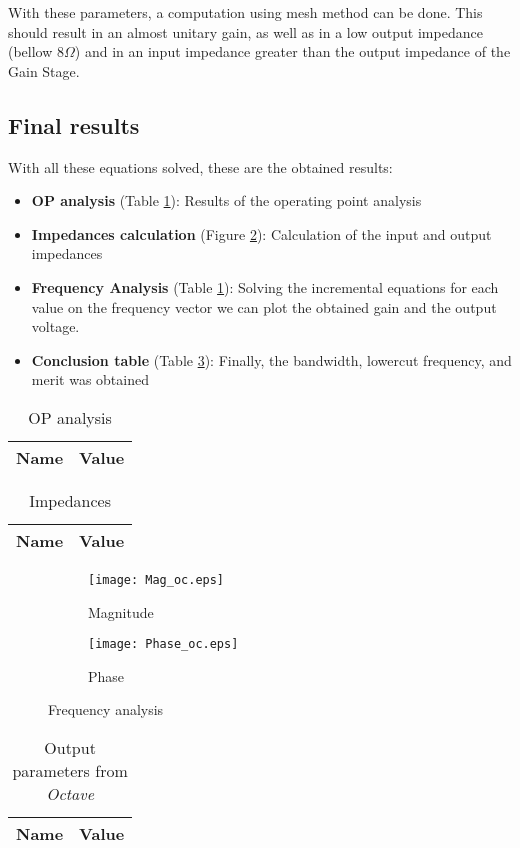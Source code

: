 With these parameters, a computation using mesh method can be done. This should result in an almost unitary gain, as well as in a low output impedance (bellow $8\Omega$) and in an input impedance greater than the output impedance of the Gain Stage.


\subsection{Final results}
\label{subsection:Octave_Results}
\indent

With all these equations solved, these are the obtained results:

\begin{itemize}
    \item \textbf{OP analysis} (Table \ref{tab:OC}): Results of the operating point analysis
    \item \textbf{Impedances calculation} (Figure \ref{tab:Impedances}): Calculation of the input and output impedances
    \item \textbf{Frequency Analysis} (Table \ref{fig:FreqA}): Solving the incremental equations for each value on the frequency vector we can plot the obtained gain and the output voltage.
    \item \textbf{Conclusion table} (Table \ref{tab:OutputParam}): Finally, the bandwidth, lowercut frequency, and merit was obtained
\end{itemize}


\begin{table}[H]
  \centering
  \begin{tabular}{|l|r|}
    \hline    
    {\bf Name} & {\bf Value} \\ \hline
    
  \end{tabular}
  \caption{OP analysis }
  \label{tab:OC}
\end{table}


\begin{table}[H]
  \centering
  \begin{tabular}{|l|r|}
    \hline    
    {\bf Name} & {\bf Value} \\ \hline
    
  \end{tabular}
  \caption{Impedances}
  \label{tab:Impedances}
\end{table}



\begin{figure}[H]
\centering
\begin{subfigure}{.48\textwidth}
  \centering
  \texttt{[image: Mag\_oc.eps]}
  \caption{Magnitude}
\end{subfigure}
\begin{subfigure}{.48\textwidth}
  \centering
  \texttt{[image: Phase\_oc.eps]}
  \caption{Phase}
\end{subfigure}
\caption{Frequency analysis}
\label{fig:FreqA}
\end{figure}



\begin{table}[H]
  \centering
  \begin{tabular}{|l|r|}
    \hline    
    {\bf Name} & {\bf Value} \\ \hline
    
  \end{tabular}
  \caption{Output parameters from {\it Octave} }
  \label{tab:OutputParam}
\end{table}
